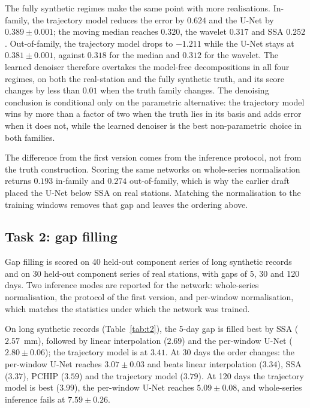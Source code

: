 The fully synthetic regimes make the same point with more realisations.
In-family, the trajectory model reduces the error by $0.624$ and the U-Net by
$0.389 \pm 0.001$; the moving median reaches $0.320$, the wavelet $0.317$ and
SSA $0.252$. Out-of-family, the trajectory model drops to $-1.211$ while the
U-Net stays at $0.381 \pm 0.001$, against $0.318$ for the median and $0.312$ for
the wavelet. The learned denoiser therefore overtakes the model-free
decompositions in all four regimes, on both the real-station and the fully
synthetic truth, and its score changes by less than $0.01$ when the truth family
changes. The denoising conclusion is conditional only on the parametric
alternative: the trajectory model wins by more than a factor of two when the
truth lies in its basis and adds error when it does not, while the learned
denoiser is the best non-parametric choice in both families.

The difference from the first version comes from the inference protocol, not
from the truth construction. Scoring the same networks on whole-series
normalisation returns $0.193$ in-family and $0.274$ out-of-family, which is why
the earlier draft placed the U-Net below SSA on real stations. Matching the
normalisation to the training windows removes that gap and leaves the ordering
above.

\subsection{Task 2: gap filling}
\label{sec:results:t2}

Gap filling is scored on 40 held-out component series of long synthetic records
and on 30 held-out component series of real stations, with gaps of 5, 30 and 120
days. Two inference modes are reported for the network: whole-series
normalisation, the protocol of the first version, and per-window normalisation,
which matches the statistics under which the network was trained.

On long synthetic records (Table~\ref{tab:t2}), the 5-day gap is filled best by
SSA ($2.57$~mm), followed by linear interpolation ($2.69$) and the per-window
U-Net ($2.80 \pm 0.06$); the trajectory model is at $3.41$. At 30 days the order
changes: the per-window U-Net reaches $3.07 \pm 0.03$ and beats linear
interpolation ($3.34$), SSA ($3.37$), PCHIP ($3.59$) and the trajectory model
($3.79$). At 120 days the trajectory model is best ($3.99$), the per-window
U-Net reaches $5.09 \pm 0.08$, and whole-series inference fails at
$7.59 \pm 0.26$.

